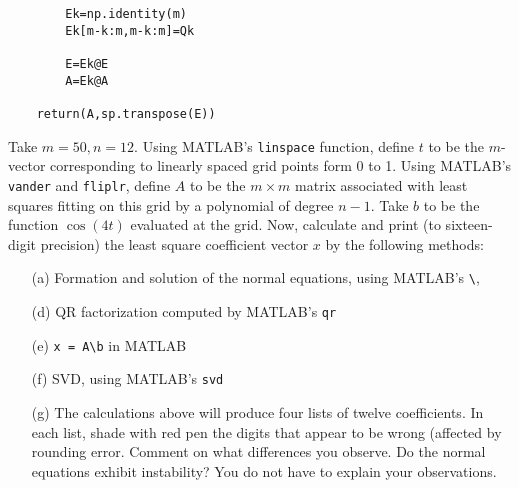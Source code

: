 \documentclass[10pt]{article}
\begin{document}
\begin{solution}[Solution]
\begin{enumerate}
\begin{lstlisting}
        Ek=np.identity(m)
        Ek[m-k:m,m-k:m]=Qk
        
        E=Ek@E
        A=Ek@A

    return(A,sp.transpose(E))
\end{lstlisting}

\end{enumerate}

\end{solution}

\begin{problem}[Exercise 11.3]
Take \( m=50, n=12 \). Using MATLAB's {\tt linspace} function, define \( t \) to be the \( m \)-vector corresponding to linearly spaced grid points form 0 to 1. Using MATLAB's {\tt vander} and {\tt fliplr}, define \( A \) to be the \( m\times m \) matrix associated with least squares fitting on this grid by a polynomial of degree \( n-1 \). Take \( b \) to be the function \( \cos(4t) \) evaluated at the grid. Now, calculate and print (to sixteen-digit precision) the least square coefficient vector \( x \) by the following methods:
\begin{enumerate}
    \item[(a)] Formation and solution of the normal equations, using MATLAB's {\tt \textbackslash },
    \item[(d)] QR factorization computed by MATLAB's {\tt qr}
    \item[(e)] {\tt x = A\textbackslash b} in MATLAB
    \item[(f)] SVD, using MATLAB's {\tt svd}
    \item[(g)] The calculations above will produce four lists of twelve coefficients. In each list, shade with red pen the digits that appear to be wrong (affected by rounding error. Comment on what differences you observe. Do the normal equations exhibit instability? You do not have to explain your observations.
\end{enumerate}
\end{problem}
\end{document}
